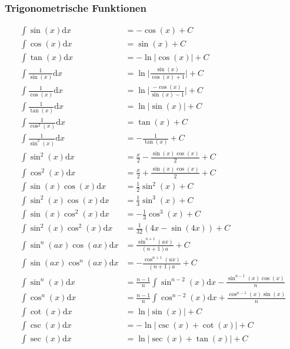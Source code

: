 \documentclass[8pt, a4paper, landscape, fleqn]{scrartcl}
\begin{document}
\begin{multicols*}{3}
				\subsubsection{Trigonometrische Funktionen}	
					\vspace{-7pt}
					\begin{align*}
					    \int \sin(x) \text{d}x&=-\cos(x) + C\\
					    \int \cos(x) \text{d}x&=\sin(x) + C\\
						\int \tan(x) \text{d}x&=-\ln\vert \cos(x) \vert + C\\
						\int\frac{1}{\sin{(x)}}\text{d}x&=\ln{\vert\frac{\sin{(x)}}{\cos{(x)}+1}\vert}+C\\
						\int\frac{1}{\cos{(x)}}\text{d}x&=\ln{\vert\frac{-\cos{(x)}}{\sin{(x)}-1}\vert}+C\\
						\int \frac{1}{\tan(x)} \text{d}x&=\ln\vert \sin(x) \vert + C\\
						\int \frac{1}{\cos^2(x)}\text{d}x&=\tan(x)+C\\
						\int \frac{1}{\sin^2{(x)}}\text{d}x&=-\frac{1}{\tan{(x)}}+C\\
						\int \sin^2(x)\text{d}x&= \frac{x}{2}-\frac{\sin(x)\cos(x)}{2}+C\\
						\int \cos^2(x)\text{d}x&= \frac{x}{2}+\frac{\sin(x)\cos(x)}{2}+C\\
						\int \sin(x)\cos(x)\text{d}x&= \frac{1}{2}\sin^2(x)+C\\
						\int \sin^2(x)\cos(x)\text{d}x&= \frac{1}{3}\sin^3(x)+C\\
						\int \sin(x)\cos^2(x)\text{d}x&= -\frac{1}{3}\cos^3(x)+C\\
						\int \sin^2(x)\cos^2(x)\text{d}x&= \frac{1}{32}(4x-\sin(4x))+C\\
						\int \sin^n(ax)\cos(ax)\text{d}x&= \frac{\sin^{n+1}(ax)}{(n+1)a}+C\\
						\int \sin(ax)\cos^n(ax)\text{d}x&= -\frac{\cos^{n+1}(ax)}{(n+1)a}+C\\
						\int \sin^n(x)\text{d}x&=\frac{n-1}{n}\int \sin^{n-2}(x)\text{d}x-\frac{\sin^{n-1}(x)\cos(x)}{n}\\
						\int \cos^n(x)\text{d}x&=\frac{n-1}{n}\int \cos^{n-2}(x)\text{d}x+\frac{\cos^{n-1}(x)\sin(x)}{n}\\
						\int \cot(x)\text{d}x&= \ln\vert \sin(x) \vert +C\\
						\int \csc(x)\text{d}x&=-\ln \vert \csc(x)+\cot(x)\vert +C\\
						\int \sec(x)\text{d}x&= \ln \vert \sec(x)+\tan(x) \vert +C\\

\end{align*}
\end{multicols*}
\end{document}
